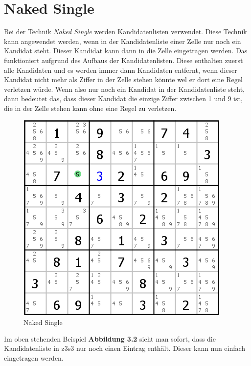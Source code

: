 \newpage
\section{Naked Single}
Bei der Technik \textit{Naked Single} werden Kandidatenlisten verwendet. Diese Technik kann angewendet werden, wenn in der Kandidatenliste einer Zelle nur noch ein Kandidat steht. Dieser Kandidat kann dann in die Zelle eingetragen werden. Das funktioniert aufgrund des Aufbaus der Kandidatenlisten. Diese enthalten zuerst alle Kandidaten und es werden immer dann Kandidaten entfernt, wenn dieser Kandidat nicht mehr als Ziffer in der Zelle stehen könnte wel er dort eine Regel verletzen würde. Wenn also nur noch ein Kandidat in der Kandidatenliste steht, dann bedeutet das, dass dieser Kandidat die einzige Ziffer zwischen 1 und 9 ist, die in der Zelle stehen kann ohne eine Regel zu verletzen.

\begin{figure}[h]
\begin{center}
\includegraphics{./img/naked_single.png}
\caption{Naked Single}
\end{center}
\end{figure}

Im oben stehenden Beispiel \textbf{Abbildung 3.2} sieht man sofort, dass die Kandidatenliste in z3s3 nur noch einen Eintrag enthält. Dieser kann nun einfach eingetragen werden.